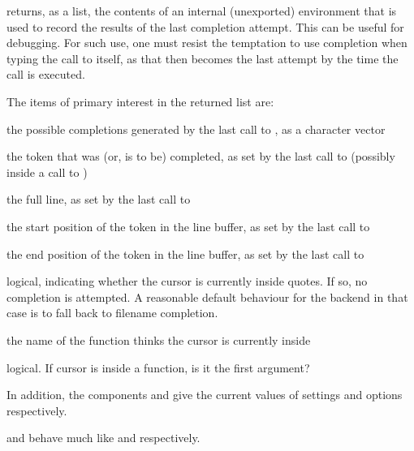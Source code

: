 \begin{Details}
\begin{description}
\end{description}

\end{Details}
%
\begin{Value}
 returns, as a list, the contents of an internal
(unexported) environment that is used to record the results of the
last completion attempt.  This can be useful for debugging.  For such
use, one must resist the temptation to use completion when typing the
call to  itself, as that then becomes the last attempt
by the time the call is executed.

The items of primary interest in the returned list are:

\begin{ldescription}
\item[\code{comps}]  the possible completions generated by the last
call to , as a character vector 
\item[\code{token}]  the token that was (or, is to be) completed, as
set by the last call to  (possibly inside a call
to ) 
\item[\code{linebuffer}]  the full line, as set by the last call to
\item[\code{start}]  the start position of the token in the line
buffer, as set by the last call to  
\item[\code{end}]  the end position of the token in the line
buffer, as set by the last call to  
\item[\code{fileName}]  logical, indicating whether the cursor is
currently inside quotes.  If so, no completion is attempted.  A
reasonable default behaviour for the backend in that case is to fall
back to filename completion.  
\item[\code{fguess}]  the name of the function  thinks
the cursor is currently inside 
\item[\code{isFirstArg}]  logical.  If cursor is inside a function, is it the
first argument? 

\end{ldescription}
In addition, the components  and  give
the current values of settings and options respectively.

 and  behave much like
 and  respectively.
\end{Value}
